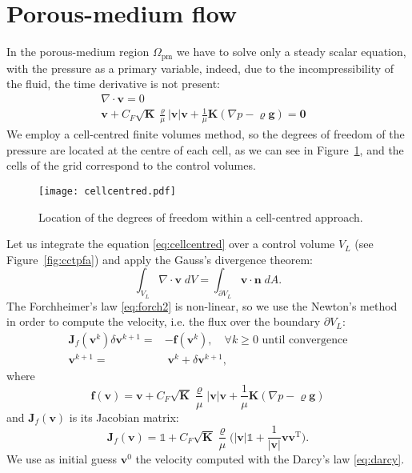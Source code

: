 \section{Porous-medium flow}
In the porous-medium region $\Omega_\text{pm}$ we have to solve only a steady 
scalar equation, with the pressure as a primary variable, indeed, due to the 
incompressibility of the fluid, the time derivative is not present:
\begin{align}
\label{eq:cellcentred}	\nabla \cdot \mathbf{v} = 0&\\
\label{eq:forch2}	\mathbf{v} + C_F \sqrt{\mathbf{K}} \frac{\varrho}{\mu} 
	|\mathbf{v}|\mathbf{v} + \frac{1}{\mu} \mathbf{K}(\nabla p - \varrho 
	\mathbf{g} ) = \mathbf{0}&
\end{align}
We employ a cell-centred finite volumes method, so the degrees of freedom of 
the pressure are located at the centre of each cell, as we can see in 
Figure~\ref{fig:cellcentred}, and the cells of the grid correspond to the 
control volumes.
\begin{figure}
	\centering
	\texttt{[image: cellcentred.pdf]}
	\caption[Cell-centred grid]{Location of the degrees of freedom within a 
	cell-centred approach.}
	\label{fig:cellcentred}
\end{figure}

Let us integrate the equation \eqref{eq:cellcentred} over a control volume 
$V_L$ (see Figure~\ref{fig:cctpfa}) and apply the Gauss's divergence theorem:
\begin{equation}
\int_{V_L} \nabla \cdot \mathbf{v} \; dV = \int_{\partial V_L} \mathbf{v} \cdot 
\mathbf{n} \; dA.
\end{equation}
The Forchheimer's law \eqref{eq:forch2} is non-linear, so we use the Newton's 
method in order to compute the velocity, i.e. the flux over the boundary 
$\partial 
V_L$:
\begin{align}
	\mathbf{J}_f(\mathbf{v}^k) \delta \mathbf{v}^{k+1} = &-\mathbf{f}(\mathbf{v}^k), \quad \text{$\forall k\geq 0$ until 
	convergence}\\
	\mathbf{v}^{k+1} = &\;\mathbf{v}^k + \delta \mathbf{v}^{k+1},
\end{align}
where
\begin{equation} \label{eq:resforch}
	\mathbf{f}(\mathbf{v}) = \mathbf{v} + C_F \sqrt{\mathbf{K}} 
	\frac{\varrho}{\mu} 
	|\mathbf{v}|\mathbf{v} + \frac{1}{\mu} \mathbf{K}(\nabla p - \varrho 
	\mathbf{g} )
\end{equation}
and $\mathbf{J}_f(\mathbf{v})$ is its Jacobian matrix:
\begin{equation} \label{eq:jacforch}
\mathbf{J}_f(\mathbf{v}) = \mathbb{1} + 
C_F\sqrt{\mathbf{K}}\frac{\varrho}{\mu}\big(|\mathbf{v}|\mathbb{1} + 
\frac{1}{|\mathbf{v}|}{\mathbf{v}\mathbf{v}^\mathrm{T}}\big).
\end{equation}
We use as initial guess $\mathbf{v}^0$ the velocity computed with the Darcy's 
law \eqref{eq:darcy}.


